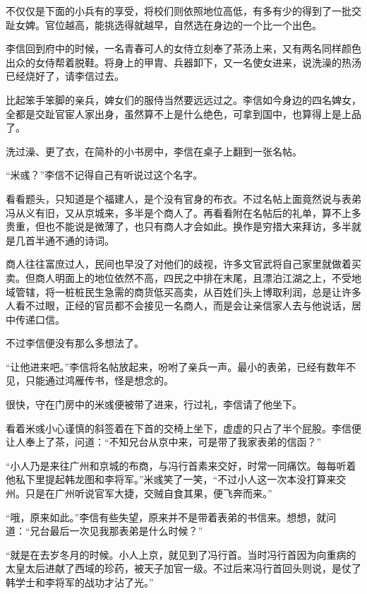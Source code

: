 不仅仅是下面的小兵有的享受，将校们则依照地位高低，有多有少的得到了一批交趾女婢。官位越高，能挑选得就越早，自然选在身边的一个比一个出色。

李信回到府中的时候，一名青春可人的女侍立刻奉了茶汤上来，又有两名同样颜色出众的女侍帮着脱鞋。将身上的甲胄、兵器卸下，又一名使女进来，说洗澡的热汤已经烧好了，请李信过去。

比起笨手笨脚的亲兵，婢女们的服侍当然要远远过之。李信如今身边的四名婢女，全都是交趾官宦人家出身，虽然算不上是什么绝色，可拿到国中，也算得上是上品了。

洗过澡、更了衣，在简朴的小书房中，李信在桌子上翻到一张名帖。

“米彧？”李信不记得自己有听说过这个名字。

看看题头，只知道是个福建人，是个没有官身的布衣。不过名帖上面竟然说与表弟冯从义有旧，又从京城来，多半是个商人了。再看看附在名帖后的礼单，算不上多贵重，但也不能说是微薄了，也只有商人才会如此。换作是穷措大来拜访，多半就是几首半通不通的诗词。

商人往往富庶过人，民间也早没了对他们的歧视，许多文官武将自己家里就做着买卖。但商人明面上的地位依然不高，四民之中排在末尾，且漂泊江湖之上，不受地域管辖，将一桩桩民生急需的商货低买高卖，从百姓们头上博取利润，总是让许多人看不过眼，正经的官员都不会接见一名商人，而是会让亲信家人去与他说话，居中传递口信。

不过李信便没有那么多想法了。

“让他进来吧。”李信将名帖放起来，吩咐了亲兵一声。最小的表弟，已经有数年不见，只能通过鸿雁传书，怪是想念的。

很快，守在门房中的米彧便被带了进来，行过礼，李信请了他坐下。

看着米彧小心谨慎的斜签着在下首的交椅上坐下，虚虚的只占了半个屁股。李信便让人奉上了茶，问道：“不知兄台从京中来，可是带了我家表弟的信函？”

“小人乃是来往广州和京城的布商，与冯行首素来交好，时常一同痛饮。每每听着他私下里提起韩龙图和李将军。”米彧笑了一笑，“不过小人这一次本没打算来交州。只是在广州听说官军大捷，交贼自食其果，便飞奔而来。”

“哦，原来如此。”李信有些失望，原来并不是带着表弟的书信来。想想，就问道：“兄台最后一次见我那表弟是什么时候？”

“就是在去岁冬月的时候。小人上京，就见到了冯行首。当时冯行首因为向重病的太皇太后进献了西域的珍药，被天子加官一级。不过后来冯行首回头则说，是仗了韩学士和李将军的战功才沾了光。”


